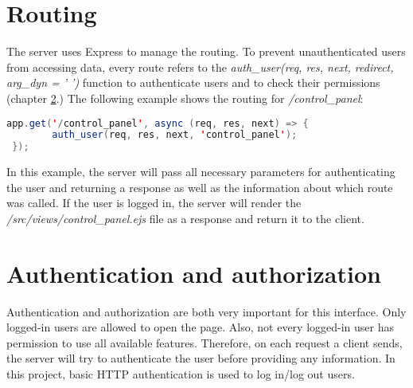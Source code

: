 
\section{Routing}
\label{sec:routing}

The server uses Express to manage the routing. To prevent unauthenticated users from accessing data, every route refers to the \textit{auth\_user(req, res, next, redirect, arg\_dyn = ' ')} function to authenticate users and to check their permissions (chapter \ref{sec:authentication_and_authorization}.) The following example shows the routing for \textit{/control\_panel}:

\begin{lstlisting}[language = Java, numbers = none]
 app.get('/control_panel', async (req, res, next) => {
 		auth_user(req, res, next, 'control_panel');
 });
\end{lstlisting}

In this example, the server will pass all necessary parameters for authenticating the user and returning a response as well as the information about which route was called. If the user is logged in, the server will render the \textit{/src/views/control\_panel.ejs} file as a response and return it to the client.





\section{Authentication and authorization}
\label{sec:authentication_and_authorization}

Authentication and authorization are both very important for this interface. Only logged-in users are allowed to open the page. Also, not every logged-in user has permission to use all available features. Therefore, on each request a client sends, the server will try to authenticate the user before providing any information. In this project, basic HTTP authentication is used to log in/log out users.\\



